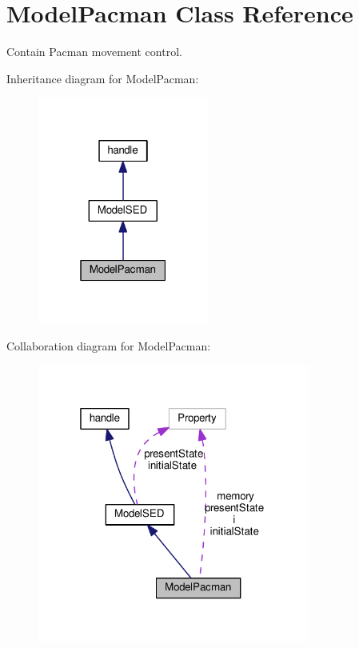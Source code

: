 \hypertarget{class_model_pacman}{}\section{Model\+Pacman Class Reference}
\label{class_model_pacman}


Contain Pacman movement control.  




Inheritance diagram for Model\+Pacman\+:
\nopagebreak
\begin{figure}[H]
\begin{center}
\leavevmode
\includegraphics[width=159pt]{class_model_pacman__inherit__graph}
\end{center}
\end{figure}


Collaboration diagram for Model\+Pacman\+:
\nopagebreak
\begin{figure}[H]
\begin{center}
\leavevmode
\includegraphics[width=253pt]{class_model_pacman__coll__graph}
\end{center}
\end{figure}
